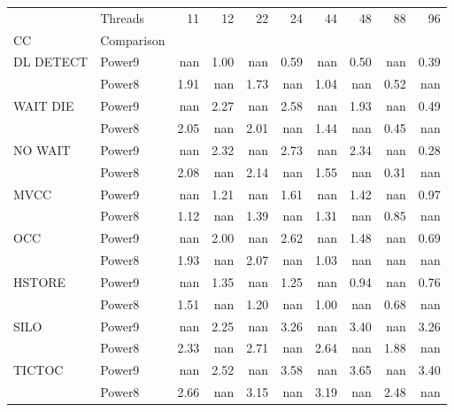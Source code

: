 \begin{tabular}{llrrrrrrrr}
\toprule
       & Threads &   11 &   12 &   22 &   24 &   44 &   48 &   88 &   96 \\
CC & Comparison &      &      &      &      &      &      &      &      \\
\midrule
DL DETECT & Power9 &  nan & 1.00 &  nan & 0.59 &  nan & 0.50 &  nan & 0.39 \\
       & Power8 & 1.91 &  nan & 1.73 &  nan & 1.04 &  nan & 0.52 &  nan \\
WAIT DIE & Power9 &  nan & 2.27 &  nan & 2.58 &  nan & 1.93 &  nan & 0.49 \\
       & Power8 & 2.05 &  nan & 2.01 &  nan & 1.44 &  nan & 0.45 &  nan \\
NO WAIT & Power9 &  nan & 2.32 &  nan & 2.73 &  nan & 2.34 &  nan & 0.28 \\
       & Power8 & 2.08 &  nan & 2.14 &  nan & 1.55 &  nan & 0.31 &  nan \\
MVCC & Power9 &  nan & 1.21 &  nan & 1.61 &  nan & 1.42 &  nan & 0.97 \\
       & Power8 & 1.12 &  nan & 1.39 &  nan & 1.31 &  nan & 0.85 &  nan \\
OCC & Power9 &  nan & 2.00 &  nan & 2.62 &  nan & 1.48 &  nan & 0.69 \\
       & Power8 & 1.93 &  nan & 2.07 &  nan & 1.03 &  nan &  nan &  nan \\
HSTORE & Power9 &  nan & 1.35 &  nan & 1.25 &  nan & 0.94 &  nan & 0.76 \\
       & Power8 & 1.51 &  nan & 1.20 &  nan & 1.00 &  nan & 0.68 &  nan \\
SILO & Power9 &  nan & 2.25 &  nan & 3.26 &  nan & 3.40 &  nan & 3.26 \\
       & Power8 & 2.33 &  nan & 2.71 &  nan & 2.64 &  nan & 1.88 &  nan \\
TICTOC & Power9 &  nan & 2.52 &  nan & 3.58 &  nan & 3.65 &  nan & 3.40 \\
       & Power8 & 2.66 &  nan & 3.15 &  nan & 3.19 &  nan & 2.48 &  nan \\
\bottomrule
\end{tabular}
